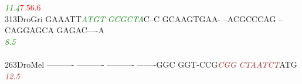 \documentclass[11pt,twoside,reqno,a4paper]{article}
\begin{document}
{\hspace*{4\charwidth}\hspace*{7\charwidth}\hspace*{6\charwidth}\textit{\textcolor{Green}{11.4}}\hspace*{1\charwidth}\hspace*{1\charwidth}\hspace*{11\charwidth}\textcolor{Red}{7.5}\hspace*{1\charwidth}\hspace*{12\charwidth}\textcolor{Red}{6.6}\hspace*{1\charwidth}\hspace*{1\charwidth}\hspace*{1\charwidth}\\
313\hspace*{1\charwidth}DroGri	GAAATT\textit{\textcolor{Green}{A}}\textit{\textcolor{Green}{T}}\textit{\textcolor{Green}{G}}\textit{\textcolor{Green}{T}}	\textit{\textcolor{Green}{G}}\textit{\textcolor{Green}{C}}\textit{\textcolor{Green}{G}}\textit{\textcolor{Green}{C}}\textit{\textcolor{Green}{T}}\textit{\textcolor{Green}{A}}C--C	GCAAGTGAA-	--ACGCCCAG	--CAGGAGCA	GAGAC----A	\\
\hspace*{4\charwidth}\hspace*{7\charwidth}\hspace*{6\charwidth}\textit{\textcolor{Green}{8.5}}\hspace*{1\charwidth}\hspace*{1\charwidth}\hspace*{1\charwidth}\hspace*{1\charwidth}\hspace*{1\charwidth}\hspace*{1\charwidth}\\
\\
263\hspace*{1\charwidth}DroMel	----------	----------	----------	-------GGC	GGT-CCG\textit{\textcolor{Brown}{C}}\textit{\textcolor{Brown}{G}}\textit{\textcolor{Brown}{G}}	\textit{\textcolor{Brown}{C}}\textit{\textcolor{Brown}{T}}\textit{\textcolor{Brown}{A}}\textit{\textcolor{Brown}{A}}\textit{\textcolor{Brown}{T}}\textit{\textcolor{Brown}{C}}\textit{\textcolor{Brown}{T}}ATG	\\
\hspace*{4\charwidth}\hspace*{7\charwidth}\hspace*{1\charwidth}\hspace*{1\charwidth}\hspace*{1\charwidth}\hspace*{1\charwidth}\hspace*{47\charwidth}\textit{\textcolor{Brown}{12.5}}\hspace*{1\charwidth}\hspace*{1\charwidth}\\
}
\end{document}

